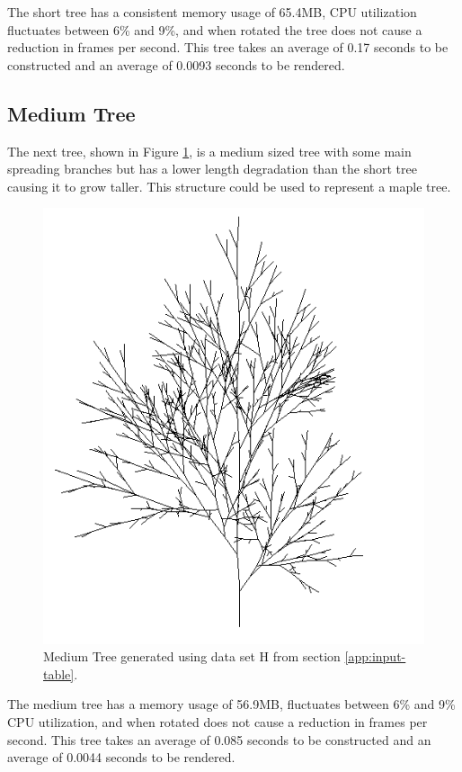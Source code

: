 \documentclass[final]{cmpreport}
\begin{document}
The short tree has a consistent memory usage of 65.4MB, CPU utilization fluctuates between 6\% and 9\%, 
and when rotated the tree does not cause a reduction in frames per second. This tree takes an average of
0.17 seconds to be constructed and an average of 0.0093 seconds to be rendered.

\subsection{Medium Tree}
The next tree, shown in Figure \ref{fig:tree-h}, is a medium sized tree with some main spreading 
branches but has a lower length degradation than the short tree causing it to grow taller. This 
structure could be used to represent a maple tree.

\begin{figure}[ht]
    \includegraphics[scale=0.7]{tree-h.PNG} 
    \centering
    \captionsetup{justification=centering}
    \caption{Medium Tree generated using data set H from section \ref{app:input-table}.}
    \label{fig:tree-h}
\end{figure}

The medium tree has a memory usage of 56.9MB, fluctuates between 6\% and 
9\% CPU utilization, and when rotated does not cause a reduction in frames per second. This tree 
takes an average of 0.085 seconds to be constructed and an average of 0.0044 seconds to be rendered. 
\end{document}
